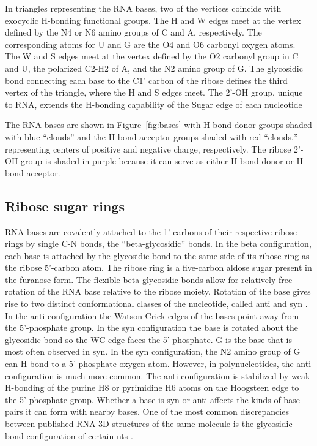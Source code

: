 In triangles representing the RNA bases, two of the vertices coincide with
exocyclic H-bonding functional groups. The H and W edges meet at the vertex
defined by the N4 or N6 amino groups of C and A, respectively. The corresponding
atoms for U and G are the O4 and O6 carbonyl oxygen atoms. The W and S edges
meet at the vertex defined by the O2 carbonyl group in C and U, the polarized
C2-H2 of A, and the N2 amino group of G. The glycosidic bond connecting each
base to the C1’ carbon of the ribose defines the third vertex of the triangle,
where the H and S edges meet. The 2'-OH group, unique to RNA, extends the
H-bonding capability of the Sugar edge of each nucleotide

The RNA bases are shown in Figure~\ref{fig:bases} with H-bond donor groups
shaded with blue ``clouds'' and the H-bond acceptor groups shaded with red
``clouds,'' representing centers of positive and negative charge, respectively.
The ribose 2'-OH group is shaded in purple because it can serve as either H-bond
donor or H-bond acceptor. 

\subsection{Ribose sugar rings}

RNA bases are covalently attached to the 1'-carbons of their respective ribose
rings by single C-N bonds, the ``beta-glycosidic'' bonds. In the beta
configuration, each base is attached by the glycosidic bond to the same side of
its ribose ring as the ribose 5'-carbon atom. The ribose ring is a five-carbon
aldose sugar present in the furanose form. The flexible beta-glycosidic bonds
allow for relatively free rotation of the RNA base relative to the ribose
moiety. Rotation of the base gives rise to two distinct conformational classes
of the nucleotide, called anti and syn \cite{Neidle2008}. In the anti
configuration the Watson-Crick edges of the bases point away from the
5’-phosphate group. In the syn configuration the base is rotated \degree
about the glycosidic bond so the WC edge faces the 5'-phosphate. G is the base
that is most often observed in syn. In the syn configuration, the N2 amino group
of G can H-bond to a 5'-phosphate oxygen atom. However, in polynucleotides, the
anti configuration is much more common. The anti configuration is stabilized by
weak H-bonding of the purine H8 or pyrimidine H6 atoms on the Hoogsteen edge to
the 5'-phosphate group. Whether a base is syn or anti affects the kinds of base
pairs it can form with nearby bases. One of the most common discrepancies
between published RNA 3D structures of the same molecule is the glycosidic bond
configuration of certain nts \cite{Leontis2002f}. 

